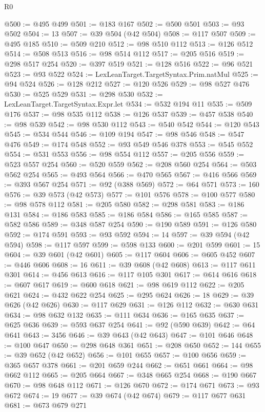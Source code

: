 \begin{lexlean}{R0}
\begin{coremodule}
@500 := @495 @499
@501 := @183 @167
@502 := @500 @501
@503 := @93 @502
@504 := 13
@507 := @39 @504 (@42 @504)
@508 := @117 @507
@509 := @495 @185
@510 := @509 @210
@512 := @98 @510 @112
@513 := @126 @512
@514 := @508 @513
@516 := @98 @514 @112
@517 := @205 @516
@519 := @298 @517 @254
@520 := @397 @519
@521 := @128 @516
@522 := @96 @521
@523 := @93 @522
@524 := LexLeanTarget.TargetSyntax.Prim.natMul
@525 := @94 @524
@526 := @128 @212
@527 := @120 @526
@529 := @98 @527 @476
@530 := @525 @529
@531 := @298 @530
@532 := LexLeanTarget.TargetSyntax.Expr.let
@534 := @532 @194 @11
@535 := @509 @176
@537 := @98 @535 @112
@538 := @126 @537
@539 := @457 @538
@540 := @98 @539
@542 := @98 @530 @112
@543 := @540 @542
@544 := @120 @543
@545 := @534 @544
@546 := @109 @194
@547 := @98 @546
@548 := @547 @476
@549 := @174 @548
@552 := @93 @549 @546 @378
@553 := @545 @552
@554 := @531 @553
@556 := @98 @554 @112
@557 := @205 @556
@559 := @523 @557 @254
@560 := @520 @559
@562 := @208 @560 @254
@564 := @503 @562 @254
@565 := @493 @564
@566 := @470 @565
@567 := @416 @566
@569 := @393 @567 @254
@571 := @92 (@388 @569)
@572 := @64 @571
@573 := 160
@576 := @39 @573 (@42 @573)
@577 := @101 @576
@578 := @100 @577
@580 := @98 @578 @112
@581 := @205 @580
@582 := @298 @581
@583 := @186 @131
@584 := @186 @583
@585 := @186 @584
@586 := @165 @585
@587 := @582 @586
@589 := @348 @587 @254
@590 := @190 @589
@591 := @126 @580
@592 := @174 @591
@593 := @93 @592
@594 := 14
@597 := @39 @594 (@42 @594)
@598 := @117 @597
@599 := @598 @133
@600 := @201 @599
@601 := 15
@604 := @39 @601 (@42 @601)
@605 := @117 @604
@606 := @605 @452
@607 := @446 @606
@608 := 16
@611 := @39 @608 (@42 @608)
@613 := @117 @611 @301
@614 := @456 @613
@616 := @117 @105 @301
@617 := @614 @616
@618 := @607 @617
@619 := @600 @618
@621 := @98 @619 @112
@622 := @205 @621
@624 := @432 @622 @254
@625 := @295 @624
@626 := 18
@629 := @39 @626 (@42 @626)
@630 := @117 @629
@631 := @126 @112
@632 := @630 @631
@634 := @98 @632 @132
@635 := @111 @634
@636 := @165 @635
@637 := @625 @636
@639 := @593 @637 @254
@641 := @92 (@590 @639)
@642 := @64 @641
@643 := 3456
@646 := @39 @643 (@42 @643)
@647 := @101 @646
@648 := @100 @647
@650 := @298 @648 @361
@651 := @208 @650
@652 := 144
@655 := @39 @652 (@42 @652)
@656 := @101 @655
@657 := @100 @656
@659 := @365 @657 @378
@661 := @201 @659 @244
@662 := @651 @661
@664 := @98 @662 @112
@665 := @205 @664
@667 := @348 @665 @254
@668 := @190 @667
@670 := @98 @648 @112
@671 := @126 @670
@672 := @174 @671
@673 := @93 @672
@674 := 19
@677 := @39 @674 (@42 @674)
@679 := @117 @677 @631
@681 := @673 @679 @271

\end{coremodule}
\end{lexlean}
